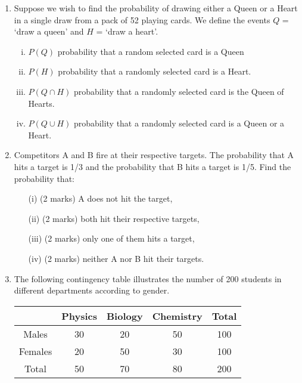 \documentclass[]{report}
\begin{document}
\begin{enumerate}[(1)]
\item 
Suppose we wish to find the probability of drawing either a Queen or a Heart
in a single draw from a pack of 52 playing cards. We define the events $Q$ =
`draw a queen' and $H$ = `draw a heart'.
\begin{enumerate}[(i)]
\item $P(Q)$ probability that a random selected card is a Queen
\item  $P(H)$ probability that a randomly selected card is a Heart.
\item  $P(Q\cap H)$ probability that a randomly selected card is the Queen of
Hearts.
\item  $P(Q\cup H)$ probability that a randomly selected card is a Queen or a Heart.
\end{enumerate}

\item 
Competitors A and B fire at their respective targets. The probability that A hits a target is 1/3 and the probability that B hits a target is 1/5. Find the probability that:
\begin{itemize}
\item[(i)] (2 marks) A does not hit the target,
\item[(ii)](2 marks)  both hit their respective targets,
\item[(iii)](2 marks)  only one of them hits a target,
\item[(iv)](2 marks) neither A nor B hit their targets.
\end{itemize}


\item 

The following contingency table illustrates the number of 200 students in different
departments according to gender.

\begin{center}
\begin{tabular}{|c|c|c|c|c|}
\hline
& Physics & Biology & Chemistry & Total \\\hline
Males & 30 & 20 & 50 & 100 \\  \hline
Females & 20 & 50 & 30 & 100 \\ \hline
Total & 50 & 70 & 80 & 200 \\
\hline
\end{tabular}
\end{center}


\end{enumerate}
\end{document}
